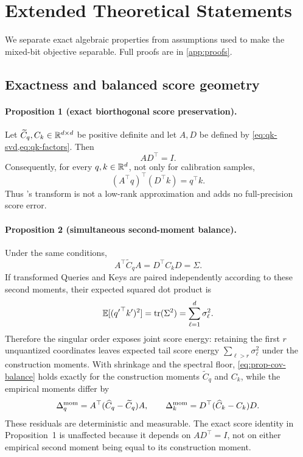 \section{Extended Theoretical Statements}
\label{app:analysis-statements}

We separate exact algebraic properties from assumptions used to make the
mixed-bit objective separable.  Full proofs are in \cref{app:proofs}.

\subsection{Exactness and balanced score geometry}

\paragraph{Proposition 1 (exact biorthogonal score preservation).}
Let $\widetilde C_q,C_k\in\mathbb{R}^{d\times d}$ be positive definite and let
$A,D$ be defined by \cref{eq:qk-svd,eq:qk-factors}.
Then
\begin{equation}
 AD^\top=I.
 \label{eq:prop-biorthogonal}
\end{equation}
Consequently, for every $q,k\in\mathbb{R}^d$, not only for calibration samples,
\begin{equation}
 (A^\top q)^\top(D^\top k)=q^\top k.
 \label{eq:prop-score-exact}
\end{equation}
Thus \method's transform is not a low-rank approximation and adds no
full-precision score error.

\paragraph{Proposition 2 (simultaneous second-moment balance).}
Under the same conditions,
\begin{equation}
 A^\top\widetilde C_qA=D^\top C_kD=\Sigma.
 \label{eq:prop-cov-balance}
\end{equation}
If transformed Queries and Keys are paired independently according to these
second moments, their expected squared dot product is
\begin{equation}
 \mathbb E[({q'}^\top k')^2]=\operatorname{tr}(\Sigma^2)
 =\sum_{\ell=1}^{d}\sigma_\ell^2.
 \label{eq:score-energy}
\end{equation}
Therefore the singular order exposes joint score energy: retaining the first
$r$ unquantized coordinates leaves expected tail score energy
$\sum_{\ell>r}\sigma_\ell^2$ under the construction moments.
With shrinkage and the spectral floor,
\cref{eq:prop-cov-balance} holds exactly for the construction moments
$\widetilde C_q$ and $C_k$, while the empirical moments differ by
\begin{equation}
 \Delta_q^{\rm mom}
 =A^\top(\widehat C_q-\widetilde C_q)A,\qquad
 \Delta_k^{\rm mom}
 =D^\top(\widehat C_k-C_k)D.
 \label{eq:shrinkage-residual}
\end{equation}
These residuals are deterministic and measurable.  The exact score identity
in Proposition~1 is unaffected because it depends on $AD^\top=I$, not on
either empirical second moment being equal to its construction moment.

